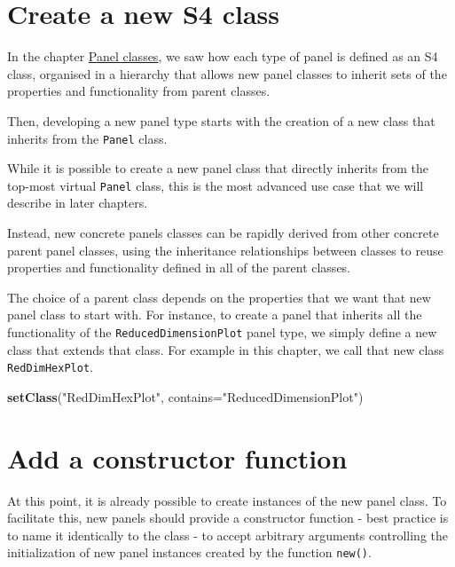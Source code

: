 \documentclass[]{book}
\newenvironment{Shaded}{\begin{snugshade}}{\end{snugshade}}
\newcommand{\KeywordTok}[1]{\textcolor[rgb]{0.13,0.29,0.53}{\textbf{#1}}}
\newcommand{\DataTypeTok}[1]{\textcolor[rgb]{0.13,0.29,0.53}{#1}}
\newcommand{\StringTok}[1]{\textcolor[rgb]{0.31,0.60,0.02}{#1}}
\newcommand{\NormalTok}[1]{#1}
\begin{document}
\section{Create a new S4 class}\label{create-a-new-s4-class}

In the chapter \protect\hyperlink{panels}{Panel classes}, we saw how
each type of panel is defined as an S4 class, organised in a hierarchy
that allows new panel classes to inherit sets of the properties and
functionality from parent classes.

Then, developing a new panel type starts with the creation of a new
class that inherits from the \texttt{Panel} class.

While it is possible to create a new panel class that directly inherits
from the top-most virtual \texttt{Panel} class, this is the most
advanced use case that we will describe in later chapters.

Instead, new concrete panels classes can be rapidly derived from other
concrete parent panel classes, using the inheritance relationships
between classes to reuse properties and functionality defined in all of
the parent classes.

The choice of a parent class depends on the properties that we want that
new panel class to start with. For instance, to create a panel that
inherits all the functionality of the \texttt{ReducedDimensionPlot}
panel type, we simply define a new class that extends that class. For
example in this chapter, we call that new class \texttt{RedDimHexPlot}.

\begin{Shaded}
\begin{Highlighting}[]
\KeywordTok{setClass}\NormalTok{(}\StringTok{"RedDimHexPlot"}\NormalTok{, }\DataTypeTok{contains=}\StringTok{"ReducedDimensionPlot"}\NormalTok{)}
\end{Highlighting}
\end{Shaded}

\section{Add a constructor function}\label{add-a-constructor-function}

At this point, it is already possible to create instances of the new
panel class. To facilitate this, new panels should provide a constructor
function - best practice is to name it identically to the class - to
accept arbitrary arguments controlling the initialization of new panel
instances created by the function \texttt{new()}.
\end{document}
